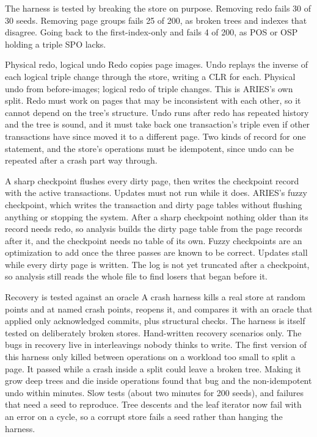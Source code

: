 The harness is tested by breaking the store on purpose. Removing redo fails
30 of 30 seeds. Removing page groups fails 25 of 200, as broken trees and
indexes that disagree. Going back to the first-index-only  and
 fails 4 of 200, as POS or OSP holding a triple SPO lacks.

\begin{decision}{Physical redo, logical undo}
 Redo copies page images. Undo replays the inverse of each
logical triple change through the store, writing a CLR for each.
 Physical undo from before-images; logical redo of triple
changes.
 This is ARIES's own split. Redo must work on pages that may be
inconsistent with each other, so it cannot depend on the tree's structure.
Undo runs after redo has repeated history and the tree is sound, and it must
take back one transaction's triple even if other transactions have since moved
it to a different page.
 Two kinds of record for one statement, and the store's operations
must be idempotent, since undo can be repeated after a crash part way through.
\end{decision}

\begin{decision}{A sharp checkpoint}
  flushes every dirty page, then writes the
checkpoint record with the active transactions. Updates must not run while it
does.
 ARIES's fuzzy checkpoint, which writes the transaction and
dirty page tables without flushing anything or stopping the system.
 After a sharp checkpoint nothing older than its record needs redo,
so analysis builds the dirty page table from the page records after it, and
the checkpoint needs no table of its own. Fuzzy checkpoints are an
optimization to add once the three passes are known to be correct.
 Updates stall while every dirty page is written. The log is not
yet truncated after a checkpoint, so analysis still reads the whole file to
find losers that began before it.
\end{decision}

\begin{decision}{Recovery is tested against an oracle}
 A crash harness kills a real store at random points and at named
crash points, reopens it, and compares it with an oracle that applied only
acknowledged commits, plus structural checks. The harness is itself tested on
deliberately broken stores.
 Hand-written recovery scenarios only.
 The bugs in recovery live in interleavings nobody thinks to write.
The first version of this harness only killed between operations on a
workload too small to split a page. It passed while a crash inside a split
could leave a broken tree. Making it grow deep trees and die inside
operations found that bug and the non-idempotent undo within minutes.
 Slow tests (about two minutes for 200 seeds), and failures that
need a seed to reproduce. Tree descents and the leaf iterator now fail with an
error on a cycle, so a corrupt store fails a seed rather than hanging the
harness.
\end{decision}

